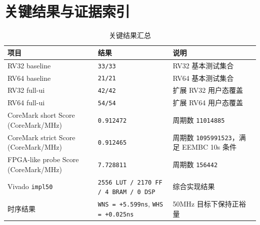 \section{关键结果与证据索引}

\begin{table}[H]
    \centering
    \small
    \caption{关键结果汇总}
    \begin{tabularx}{0.95\textwidth}{L{0.28\textwidth} L{0.22\textwidth} Y}
        \toprule
        项目 & 结果 & 说明 \\
        \midrule
        RV32 baseline & \texttt{33/33} & RV32 基本测试集合 \\
        RV64 baseline & \texttt{21/21} & RV64 基本测试集合 \\
        RV32 full-ui & \texttt{42/42} & 扩展 RV32 用户态覆盖 \\
        RV64 full-ui & \texttt{54/54} & 扩展 RV64 用户态覆盖 \\
        CoreMark short Score (CoreMark/MHz) & \texttt{0.912472} & 周期数 \texttt{11014885} \\
        CoreMark strict Score (CoreMark/MHz) & \texttt{0.912465} & 周期数 \texttt{1095991523}，满足 EEMBC 10s 条件 \\
        FPGA-like probe Score (CoreMark/MHz) & \texttt{7.728811} & 周期数 \texttt{156442} \\
        Vivado \texttt{impl50} & \texttt{2556 LUT / 2170 FF / 4 BRAM / 0 DSP} & 综合实现结果 \\
        时序结果 & \texttt{WNS = +5.599ns}, \texttt{WHS = +0.025ns} & 50MHz 目标下保持正裕量 \\
        \bottomrule
    \end{tabularx}
\end{table}

